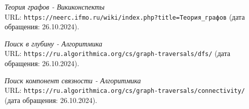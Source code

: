  
\begin{thebibliography}{99}
	
	{\itshape Теория графов - Викиконспекты} \\URL: \texttt{https://neerc.ifmo.ru/wiki/index.php?title=Теория\_графов} (дата обращения: 26.10.2024).
	
	{\itshape Поиск в глубину - Алгоритмика} \\URL: \texttt{https://ru.algorithmica.org/cs/graph-traversals/dfs/} (дата обращения: 26.10.2024).
	
	{\itshape Поиск компонент связности - Алгоритмика} \\URL: \texttt{https://ru.algorithmica.org/cs/graph-traversals/connectivity/} (дата обращения: 26.10.2024).
	
\end{thebibliography}
\pagebreak